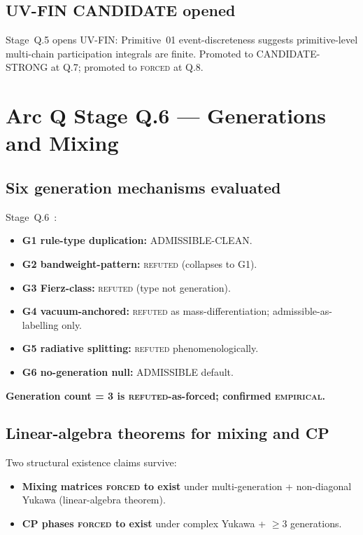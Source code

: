 \documentclass[11pt,a4paper]{article}
\begin{document}
\subsection{UV-FIN CANDIDATE opened}

Stage~Q.5 opens UV-FIN: Primitive~01 event-discreteness suggests primitive-level multi-chain participation integrals are finite. Promoted to CANDIDATE-STRONG at Q.7; promoted to \textsc{forced} at Q.8.

\section{Arc Q Stage Q.6 --- Generations and Mixing}

\subsection{Six generation mechanisms evaluated}

Stage~Q.6~\cite{q6gen}:
\begin{itemize}
  \item \textbf{G1 rule-type duplication:} ADMISSIBLE-CLEAN.
  \item \textbf{G2 bandweight-pattern:} \textsc{refuted} (collapses to G1).
  \item \textbf{G3 Fierz-class:} \textsc{refuted} (type not generation).
  \item \textbf{G4 vacuum-anchored:} \textsc{refuted} as mass-differentiation; admissible-as-labelling only.
  \item \textbf{G5 radiative splitting:} \textsc{refuted} phenomenologically.
  \item \textbf{G6 no-generation null:} ADMISSIBLE default.
\end{itemize}

\textbf{Generation count = 3 is \textsc{refuted}-as-forced; confirmed \textsc{empirical}.}

\subsection{Linear-algebra theorems for mixing and CP}

Two structural existence claims survive:
\begin{itemize}
  \item \textbf{Mixing matrices \textsc{forced} to exist} under multi-generation + non-diagonal Yukawa (linear-algebra theorem).
  \item \textbf{CP phases \textsc{forced} to exist} under complex Yukawa + $\geq 3$ generations.
\end{itemize}
\end{document}
